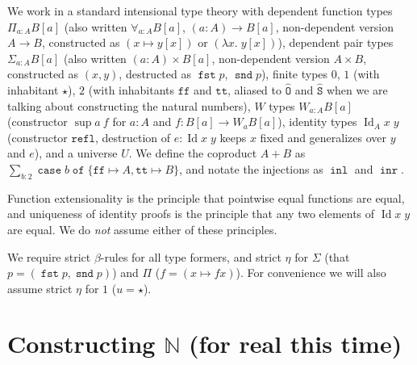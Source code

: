 \documentclass[a4paper,UKenglish,cleveref,nameinlink,autoref,thm-restate]{lipics-v2019}
\newcommand{\zero}{0}
\newcommand{\one}{1}
\newcommand{\bool}{2}
\newcommand{\true}{\mathtt{tt}}
\newcommand{\false}{\mathtt{ff}}
\newcommand{\codeO}{\mathtt{\hat{O}}}
\newcommand{\codeS}{\mathtt{\hat{S}}}
\DeclareMathOperator{\supop}{sup}
\renewcommand{\sup}[2]{\supop {#1}\:\!{#2}}
\newcommand{\N}{\hyperref[define-N]{\mathbb{N}}}
\DeclareMathOperator{\case}{\mathtt{case}}
\newcommand{\caset}[2]{\case {#1}\;\mathtt{of}\;\{{#2}\}}
\DeclareMathOperator{\Idop}{\mathrm{Id}}
\newcommand{\Id}[2]{\Idop {#1}\;{#2}}
\newcommand{\IdA}[3]{\Idop_{#1}{#2}\;{#3}}
\newcommand{\refl}{\mathtt{refl}}
\DeclareMathOperator{\inl}{\mathtt{inl}}
\DeclareMathOperator{\inr}{\mathtt{inr}}
\DeclareMathOperator{\fst}{\mathtt{fst}}
\DeclareMathOperator{\snd}{\mathtt{snd}}
\begin{document}
We work in a standard intensional type theory with
dependent function types $\Pi_{a : A}B[a]$ (also written $\forall_{a : A}B[a]$, $(a : A) \to B[a]$, non-dependent version $A \to B$, constructed as $(x \mapsto y[x])$ or $(\lambda x.\;y[x])$),
dependent pair types $\Sigma_{a : A}B[a]$ (also written $(a : A) \times B[a]$, non-dependent version $A \times B$, constructed as $(x, y)$, destructed as $\fst p$, $\snd p$),
finite types $\zero$, $\one$ (with inhabitant $\star$), $\bool$ (with inhabitants $\false$ and $\true$, aliased to $\codeO$ and $\codeS$ when we are talking about constructing the natural numbers),
$W$ types $W_{a : A}B[a]$ (constructor $\sup{a}{f}$ for $a : A$ and $f : B[a] \to W_{a}B[a]$),
identity types $\IdA{A}{x}{y}$ (constructor $\refl$, destruction of $e : \Id{x}{y}$ keeps $x$ fixed and generalizes over $y$ and $e$),
and a universe $U$.
We define the coproduct $A + B$ as $\sum_{b : \bool}\caset{b}{\false\mapsto A, \true\mapsto B}$, and notate the injections as $\inl$ and $\inr$.

Function extensionality is the principle that pointwise equal functions are equal, and uniqueness of identity proofs is the principle that any two elements of $\Id{x}{y}$ are equal. We do \emph{not} assume either of these principles.

We require strict $\beta$-rules for all type formers, and strict $\eta$ for $\Sigma$ (that $p = (\fst p, \snd p)$) and $\Pi$ ($f = (x \mapsto f x)$). For convenience we will also assume strict $\eta$ for $\one$ ($u = \star$).

\section{Constructing \texorpdfstring{$\N$}{ℕ} (for real this time)}
\end{document}
